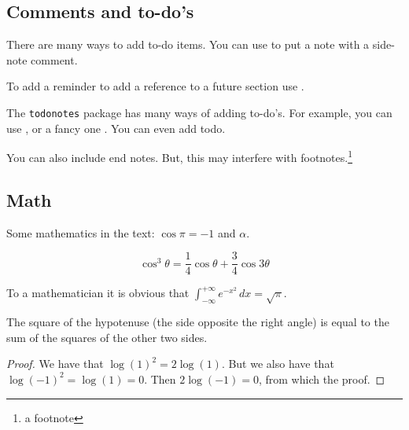 \subsection{Comments and to-do's}
There are many ways to add to-do items.
You can use  to put a note with a side-note comment.

To add a reminder to add a reference to a future section use
.

The \texttt{todonotes} package has many ways of adding to-do's.
For example, you can use , or a fancy one .
You can even add  todo.

\begin{comment}
Everything inside this section will be ignore.
The comment package can also support generic comment environment, and conditional comments.
\end{comment}

You can also include end notes. 
But, this may interfere with footnotes.\footnote{a footnote}

\subsection{Math}

Some mathematics in the text: $\cos\pi=-1$ and $\alpha$.

\begin{equation}
\cos^3 \theta =\frac{1}{4}\cos\theta+\frac{3}{4}\cos 3\theta
\label{eq:refname2}
\end{equation}

\lipsum[5] %

\begin{definition}[Gauss]
To a mathematician it is obvious that
$\int_{-\infty}^{+\infty}
e^{-x^2}\,dx=\sqrt{\pi}$.
\end{definition}

\begin{theorem}[Pythagoras]
The square of the hypotenuse (the side opposite the right angle) is equal to the sum of the squares of the other two sides.
\end{theorem}

\begin{proof}
We have that $\log(1)^2 = 2\log(1)$.
But we also have that $\log(-1)^2=\log(1)=0$.
Then $2\log(-1)=0$, from which the proof.
\end{proof}

